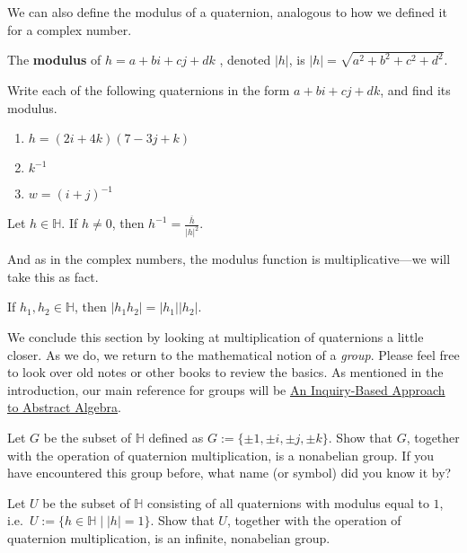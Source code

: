 We can also define the modulus of a quaternion, analogous to how we defined it for a complex number.

\begin{definition}
The \textbf{modulus} of $h=a + bi+ cj + dk$ , denoted $|h|$, is $|h| = \sqrt{a^2 + b^2+c^2+d^2}$. 
\end{definition}

\begin{problem}\label{prob.QuaternionCheckin}
Write each of the following quaternions in the form $a+bi+cj+dk$, and find its modulus.
\begin{multicols}{2}
\begin{enumerate}
\item $h = (2i+4k)(7-3j+k)$
\item $k^{-1}$
\item $w = (i+j)^{-1}$
\end{enumerate}
\end{multicols}
\end{problem}

\begin{theorem}
Let $h\in \mathbb{H}$. If $h\neq 0$, then $h^{-1} = \displaystyle\frac{\overline{h}}{|h|^2}$.
\end{theorem}

And as in the complex numbers, the modulus function is multiplicative---we will take this as fact.

\begin{fact}
If $h_1,h_2\in \mathbb{H}$, then $|h_1h_2| = |h_1||h_2|$.
\end{fact}

We conclude this section by looking at multiplication of quaternions a little closer. As we do, we return to the mathematical notion of a \emph{group}. Please feel free to look over old notes or other books to review the basics. As mentioned in the introduction, our main reference for groups will be  \href{https://github.com/dcernst/IBL-AbstractAlgebra/blob/master/Fall2021/IBL-AbstractAlgebra.pdf}{An Inquiry-Based Approach to Abstract Algebra}.

\begin{problem}
Let $G$ be the subset of $\mathbb{H}$ defined as $G:=\{\pm1,\pm i,\pm j,\pm k\}$. Show that $G$, together with the operation of quaternion multiplication, is a nonabelian group. If you have encountered this group before, what name (or symbol) did you know it by?
\end{problem}

\begin{problem}
Let $U$ be the subset of $\mathbb{H}$ consisting of all quaternions with modulus equal to $1$, i.e.~$U:=\{h\in \mathbb{H}\mid |h| = 1\}$. Show that $U$, together with the operation of quaternion multiplication, is an infinite, nonabelian group.
\end{problem}

